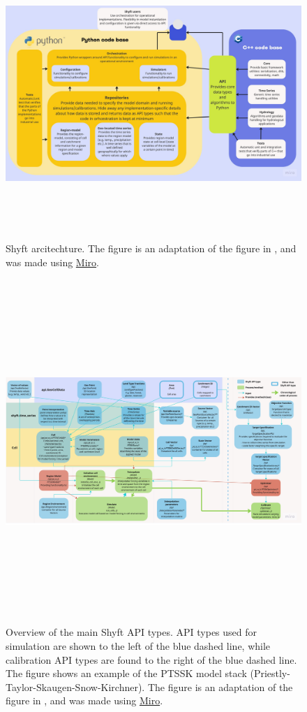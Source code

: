 \begin{figure}[ht]
    \centering
    \includegraphics[width=1.1\textwidth,height=11cm]{figures/methods/Shyft Architecture.jpg}
    \caption{Shyft arcitechture. The figure is an adaptation of the figure in \autocite{burkhartShyftV4Framework2021}, and was made using \href{https://miro.com}{Miro}.}
    \label{fig:shyft_architecture}
\end{figure}


\begin{figure}[ht]
    \centering
    \includegraphics[width=1.1\textwidth,height=13cm]{figures/methods/Swimlane Diagram.jpg}
    \caption{Overview of the main Shyft API types. API types used for simulation are shown to the left of the blue dashed line, while calibration API types are found to the right of the blue dashed line. The figure shows an example of the PTSSK model stack (Priestly-Taylor-Skaugen-Snow-Kirchner). The figure is an adaptation of the figure in \autocite{burkhartShyftV4Framework2021}, and was made using \href{https://miro.com}{Miro}.}
    \label{fig:shyft_api_types}
\end{figure}

